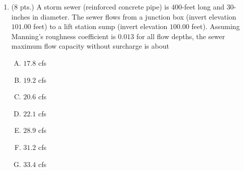 \documentclass[11pt]{article}
\begin{document}
\begin{enumerate}
%
\item  (8 pts.) 
A storm sewer (reinforced concrete pipe) is 400-feet long and 30-inches in diameter.  The sewer flows from a junction box (invert elevation $101.00$ feet) to a lift station sump (invert elevation $100.00$ feet).  Assuming Manning's roughness coefficient is $0.013$ for all flow depths, the sewer maximum flow capacity without surcharge is about%
\begin{enumerate} [(A)]
\item  $17.8$ cfs
\item  $19.2$ cfs
\item  $20.6$ cfs
\item  $22.1$ cfs
\item  $28.9$ cfs
\item  $31.2$ cfs
\item  $33.4$ cfs
\end{enumerate}



\end{enumerate}
\end{document}
